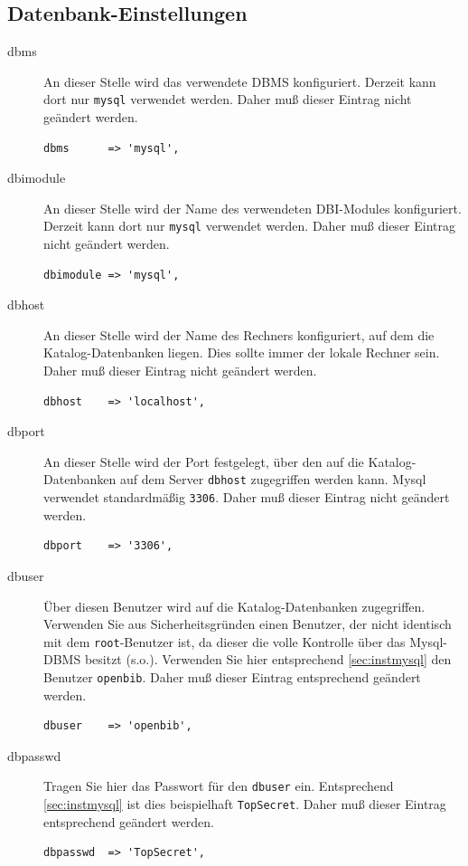 \documentclass[11pt, twoside, a4paper, BCOR8mm, DIV12, bibtotoc,idxtotoc]{scrbook}
\begin{document}
\subsection{Datenbank-Einstellungen}


\begin{description}
\item[dbms] An dieser Stelle wird das verwendete DBMS
  konfiguriert. Derzeit kann dort nur \texttt{mysql} verwendet
  werden. Daher muß dieser Eintrag nicht geändert werden.
\begin{verbatim}
dbms      => 'mysql',
\end{verbatim}

\item[dbimodule] An dieser Stelle wird der Name des verwendeten
  DBI-Modules konfiguriert. Derzeit kann dort nur \texttt{mysql}
  verwendet werden. Daher muß dieser Eintrag nicht geändert werden.
\begin{verbatim}
dbimodule => 'mysql',
\end{verbatim}
\item[dbhost] An dieser Stelle wird der Name des Rechners
  konfiguriert, auf dem die Katalog-Datenbanken liegen. Dies sollte
  immer der lokale Rechner sein. Daher muß dieser Eintrag nicht
  geändert werden.
\begin{verbatim}
dbhost    => 'localhost',
\end{verbatim}
\item[dbport] An dieser Stelle wird der Port festgelegt, über den auf
  die Katalog-Datenbanken auf dem Server \texttt{dbhost} zugegriffen
  werden kann. Mysql verwendet standardmäßig \texttt{3306}. Daher
  muß dieser Eintrag nicht geändert werden.
\begin{verbatim}
dbport    => '3306',
\end{verbatim}
\item[dbuser] Über diesen Benutzer wird auf die Katalog-Datenbanken
  zugegriffen. Verwenden Sie aus Sicherheitsgründen einen Benutzer,
  der nicht identisch mit dem \texttt{root}-Benutzer ist, da dieser
  die volle Kontrolle über das Mysql-DBMS besitzt (s.o.). Verwenden
  Sie hier entsprechend \ref{sec:instmysql} den Benutzer
  \texttt{openbib}. Daher muß dieser Eintrag entsprechend geändert
  werden.
\begin{verbatim}
dbuser    => 'openbib',
\end{verbatim}
\item[dbpasswd] Tragen Sie hier das Passwort für den \texttt{dbuser}
  ein. Entsprechend \ref{sec:instmysql} ist dies beispielhaft
  \texttt{TopSecret}. Daher muß dieser Eintrag entsprechend geändert
  werden.
\begin{verbatim}
dbpasswd  => 'TopSecret',
\end{verbatim}
\end{description}
\end{document}
